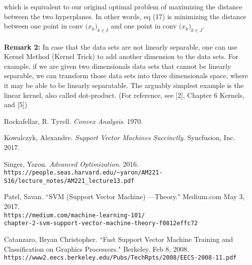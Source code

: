 \documentclass[11pt, a4paper]{article}
\begin{document}
which is equivalent to our original optimal problem of maximizing the distance between the two hyperplanes. In other words, eq (17) is minimizing the distance between one point in conv $\big(x_k\big)_{k\in I}$ and one point in conv $\big(x_k\big)_{k\in J}$.\\ \\
\textbf{Remark 2:} In case that the data sets are not linearly separable, one can use Kernel Method (Kernel Trick) to add another dimension to the data sets. For example, if we are given two dimensionals data sets that cannot be linearly separable, we can transform those data sets into three dimensionals space, where it may be able to be linearly separatable. The arguably simplest example is the linear kernel, also called dot-product. (For reference, see [2], Chapter 6 Kernels, and [5])

\begin{thebibliography}{9}
Rockafellar, R. Tyrell. 
\textit{Convex Analysis}. 
1970.
 
Kowalczyk, Alexandre.
\textit{Support Vector Machines Succinctly}. 
Syncfusion, Inc. 2017.

Singer, Yaron.
\textit{Advanced Optimization}. 
2016.
\\ \texttt{https://people.seas.harvard.edu/\textasciitilde yaron/AM221-S16/lecture\_notes/AM221\_lecture13.pdf}

Patel, Savan.
``SVM (Support Vector Machine) —Theory." Medium.com 
May 3, 2017.
\\ \texttt{https://medium.com/machine-learning-101/ \\ chapter-2-svm-support-vector-machine-theory-f0812effc72}

Catanzaro, Bryan Christopher.
``Fast Support Vector Machine Training and
Classification on Graphics Processors." Berkeley.
Feb 8, 2008.
\\ \texttt{https://www2.eecs.berkeley.edu/Pubs/TechRpts/2008/EECS-2008-11.pdf}
\end{thebibliography}
\end{document}
